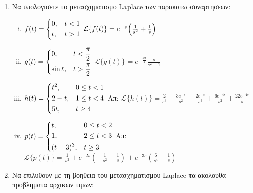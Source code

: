 \begin{enumerate}
\begin{enumerate}[i)]
\end{enumerate}

\item Να υπολογισετε το μετασχηματισμο Laplace των παρακατω συναρτησεων:

\begin{enumerate}[i)]

\item $f(t)=\begin{dcases} 0, & t<1 \\ t, & t>1 \end{dcases}$ \hfill
$\mathcal{L}\{f(t)\}=e^{-s}\Bigl(\frac{1}{s^2}+\frac{1}{s}\Bigr)$

\item $g(t)=\begin{dcases} 0, & t<\frac{\pi}{2} \\ \sin t, & t>\frac{\pi}{2} \end{dcases}$ \hfill $\mathcal{L}\{g(t)\}=e^{-\frac{s\pi}{2}}\frac{s}{s^2+1}$

\item $h(t)=\begin{dcases} t^{2}, & 0\leq t<1 \\ 2-t, & 1\leq t < 4 \\
5t, & t\geq 4
\end{dcases}$ \hfill Απ: $\mathcal{L}\{h(t)\}=\frac{2}{s^{3}}-\frac{3e^{-s}}{s^{2}}-\frac{2e^{-s}}{s^{3}}+\frac{6e^{-4s}}{s^{2}}+\frac{22e^{-4s}}{s}$

\item $p(t)=\begin{dcases} t, & 0\leq t< 2 \\ 1, & 2\leq t < 3 \\
(t-3)^{3}, & t\geq 3
\end{dcases}$ \hfill Απ: $\mathcal{L}\{p(t)\}=\frac{1}{s^{2}}+e^{-2s}\left(-\frac{1}{s^{2}}-\frac{1}{s}\right)+e^{-3s}\left(\frac{6}{s^{4}}-\frac{1}{s}\right)$
\end{enumerate}

\item Να επιλυθουν με τη βοηθεια του μετασχηματισμου Laplace τα ακολουθα προβληματα αρχικων τιμων:

\begin{enumerate}[i)]


\end{enumerate}
\end{enumerate}
